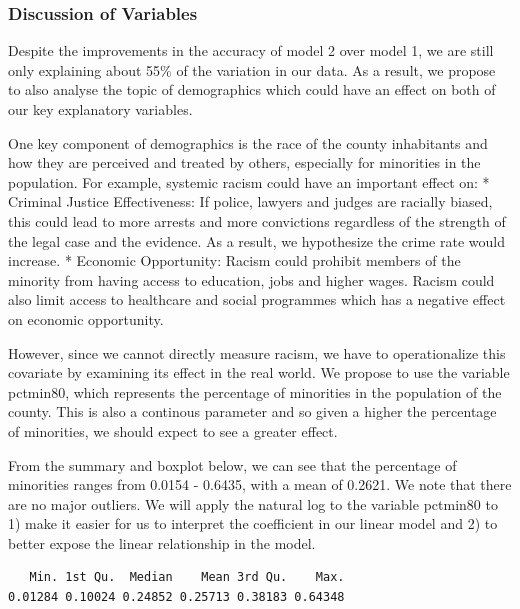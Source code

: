 \documentclass[]{article}
\newenvironment{Shaded}{}{}
\newcommand{\KeywordTok}[1]{\textcolor[rgb]{0.00,0.00,1.00}{#1}}
\newcommand{\NormalTok}[1]{#1}
\newcommand{\OperatorTok}[1]{#1}
\begin{document}
\hypertarget{discussion-of-variables}{%
\subsubsection{Discussion of Variables}\label{discussion-of-variables}}

Despite the improvements in the accuracy of model 2 over model 1, we are
still only explaining about 55\% of the variation in our data. As a
result, we propose to also analyse the topic of demographics which could
have an effect on both of our key explanatory variables.

One key component of demographics is the race of the county inhabitants
and how they are perceived and treated by others, especially for
minorities in the population. For example, systemic racism could have an
important effect on: * Criminal Justice Effectiveness: If police,
lawyers and judges are racially biased, this could lead to more arrests
and more convictions regardless of the strength of the legal case and
the evidence. As a result, we hypothesize the crime rate would increase.
* Economic Opportunity: Racism could prohibit members of the minority
from having access to education, jobs and higher wages. Racism could
also limit access to healthcare and social programmes which has a
negative effect on economic opportunity.

However, since we cannot directly measure racism, we have to
operationalize this covariate by examining its effect in the real world.
We propose to use the variable pctmin80, which represents the percentage
of minorities in the population of the county. This is also a continous
parameter and so given a higher the percentage of minorities, we should
expect to see a greater effect.

From the summary and boxplot below, we can see that the percentage of
minorities ranges from 0.0154 - 0.6435, with a mean of 0.2621. We note
that there are no major outliers. We will apply the natural log to the
variable pctmin80 to 1) make it easier for us to interpret the
coefficient in our linear model and 2) to better expose the linear
relationship in the model.

\begin{Shaded}
\end{Shaded}

\begin{verbatim}
   Min. 1st Qu.  Median    Mean 3rd Qu.    Max. 
0.01284 0.10024 0.24852 0.25713 0.38183 0.64348 
\end{verbatim}
\end{document}
